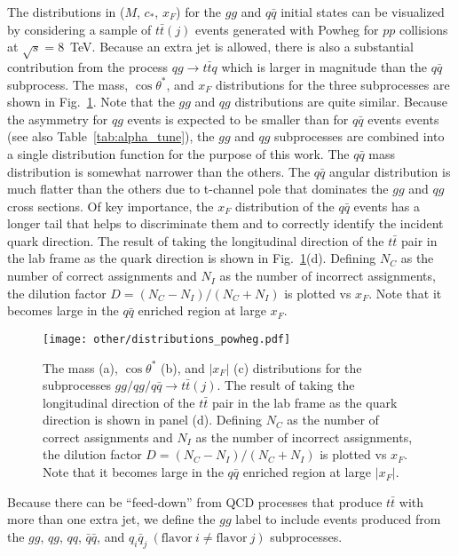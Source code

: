 The distributions in ($M$, $c_*$, $x_F$) for the $gg$ and $q\bar q$ initial states can be visualized by considering a sample of $t\bar t(j)$ events generated with Powheg for $pp$ collisions at $\sqrt{s}=8$~TeV.  Because an extra jet is allowed, there is also a substantial contribution from the process $qg\to t\bar t q$ which is larger in magnitude than the $q\bar q$ subprocess.  The mass, $\cos\theta^*$, and $x_F$ distributions for the three subprocesses are shown in Fig.~\ref{fig:distributions}.  Note that the $gg$ and $qg$ distributions are quite similar.  Because the asymmetry for $qg$ events is expected to be smaller than for $q\bar q$ events events \cite{Kuhn:1998kw} (see also Table~\ref{tab:alpha_tune}), the $gg$ and $qg$ subprocesses are combined into a single distribution function for the purpose of this work.  The $q\bar q$ mass distribution is somewhat narrower than the others.  The $q\bar q$ angular distribution is much flatter than the others due to t-channel pole that dominates the $gg$ and $qg$ cross sections.  Of key importance, the $x_F$ distribution of the $q\bar q$ events has a longer tail that helps to discriminate them and to correctly identify the incident quark direction.  The result of taking the longitudinal direction of the $t\bar t$ pair in the lab frame as the quark direction is shown in Fig.~\ref{fig:distributions}(d).  Defining $N_C$ as the number of correct assignments and $N_I$ as the number of incorrect assignments, the dilution factor $D=(N_C-N_I)/(N_C+N_I)$ is plotted vs $x_F$.  Note that it becomes large in the $q\bar q$ enriched region at large $x_F$.
\begin{figure}[hbt]
  \begin{center}
    \texttt{[image: other/distributions\_powheg.pdf]}
  \caption{\small The mass (a), $\cos\theta^*$ (b), and $|x_F|$ (c) distributions for the subprocesses $gg/qg/q\bar q\to t\bar t(j)$.  The result of taking the longitudinal direction of the $t\bar t$ pair in the lab frame as the quark direction is shown in panel (d).  Defining $N_C$ as the number of correct assignments and $N_I$ as the number of incorrect assignments, the dilution factor $D=(N_C-N_I)/(N_C+N_I)$ is plotted vs $x_F$.  Note that it becomes large in the $q\bar q$ enriched region at large $|x_F|$.}
    \label{fig:distributions}
  \end{center}
\end{figure}

Because there can be ``feed-down'' from QCD processes that produce $t\bar t$ with more than one extra jet, we define the $gg$ label to include events produced from the $gg$, $qg$, $qq$, $\bar q \bar q$, and $q_i\bar q_j\ (\mathrm{flavor}\ i\neq \mathrm{flavor}\ j)$ subprocesses.

